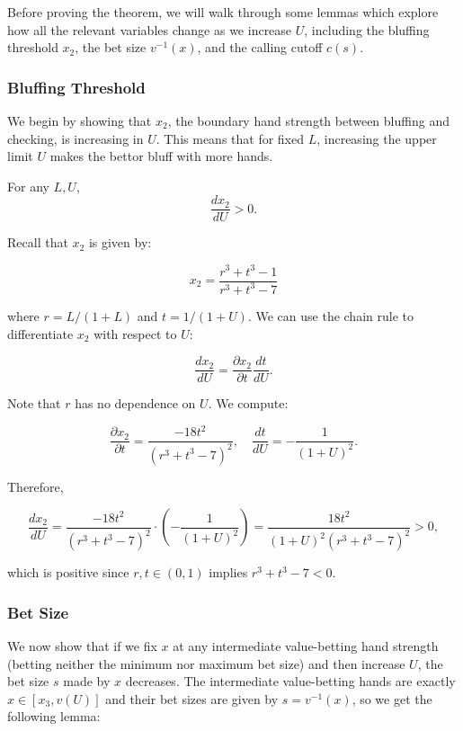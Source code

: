 \documentclass[../../main/main.tex]{subfiles}
\begin{document}
Before proving the theorem, we will walk through some lemmas which explore how all the relevant variables change as we increase $U$, including the bluffing threshold $x_2$, the bet size $v^{-1}(x)$, and the calling cutoff $c(s)$.

\subsubsection{Bluffing Threshold}

We begin by showing that $x_2$, the boundary hand strength between bluffing and checking, is increasing in $U$. This means that for fixed $L$, increasing the upper limit $U$ makes the bettor bluff with more hands.

\begin{lemma}
    \label{lem:x2_increasing}
    For any $L, U$,
    $$ \frac{d x_2}{d U} > 0. $$
\end{lemma}

\begin{customproof}
    Recall that $x_2$ is given by:

    \[ x_2 = \frac{r^{3} + t^{3} - 1}{r^{3} + t^{3} - 7} \]

    where $r = L/(1+L)$ and $t = 1/(1+U)$. We can use the chain rule to differentiate $x_2$ with respect to $U$:

    \[ \frac{d x_2}{d U} = \frac{\partial x_2}{\partial t} \frac{d t}{d U}. \]

    Note that $r$ has no dependence on $U$. We compute:

    \[ \frac{\partial x_2}{\partial t} = \frac{-18 t^{2}}{\left(r^{3} + t^{3} - 7\right)^{2}}, \quad \frac{d t}{d U} = - \frac{1}{(1+U)^2}. \]

    Therefore,

    \[ \frac{d x_2}{d U} = \frac{-18 t^{2}}{\left(r^{3} + t^{3} - 7\right)^{2}} \cdot \left(- \frac{1}{(1+U)^2}\right) = \frac{18 t^{2}}{(1+U)^2\left(r^{3} + t^{3} - 7\right)^{2}} > 0, \]

    which is positive since $r, t \in (0, 1)$ implies $r^3 + t^3 - 7 < 0$.

\end{customproof}

\subsubsection{Bet Size}

We now show that if we fix $x$ at any intermediate value-betting hand strength (betting neither the minimum nor maximum bet size) and then increase $U$, the bet size $s$ made by $x$ decreases. The intermediate value-betting hands are exactly $x \in [x_3, v(U)]$ and their bet sizes are given by $s = v^{-1}(x)$, so we get the following lemma:
\end{document}
